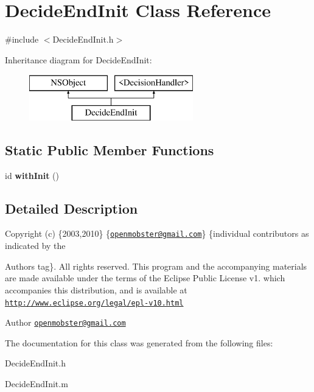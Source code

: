 \hypertarget{interface_decide_end_init}{
\section{\-Decide\-End\-Init \-Class \-Reference}
\label{interface_decide_end_init}
}


{\ttfamily \#include $<$\-Decide\-End\-Init.\-h$>$}

\-Inheritance diagram for \-Decide\-End\-Init\-:\begin{figure}[H]
\begin{center}
\leavevmode
\includegraphics[height=2.000000cm]{interface_decide_end_init}
\end{center}
\end{figure}
\subsection*{\-Static \-Public \-Member \-Functions}
\begin{DoxyCompactItemize}
\item 
\hypertarget{interface_decide_end_init_a112e4fd0f92b3ae2532c926bd04b22a0}{
id {\bfseries with\-Init} ()}
\label{interface_decide_end_init_a112e4fd0f92b3ae2532c926bd04b22a0}

\end{DoxyCompactItemize}


\subsection{\-Detailed \-Description}
\-Copyright (c) \{2003,2010\} \{\href{mailto:openmobster@gmail.com}{\tt openmobster@gmail.\-com}\} \{individual contributors as indicated by the \begin{DoxyAuthor}{\-Authors}
tag\}. \-All rights reserved. \-This program and the accompanying materials are made available under the terms of the \-Eclipse \-Public \-License v1. which accompanies this distribution, and is available at \href{http://www.eclipse.org/legal/epl-v10.html}{\tt http\-://www.\-eclipse.\-org/legal/epl-\/v10.\-html}
\end{DoxyAuthor}
\begin{DoxyAuthor}{\-Author}
\href{mailto:openmobster@gmail.com}{\tt openmobster@gmail.\-com} 
\end{DoxyAuthor}


\-The documentation for this class was generated from the following files\-:\begin{DoxyCompactItemize}
\item 
\-Decide\-End\-Init.\-h\item 
\-Decide\-End\-Init.\-m\end{DoxyCompactItemize}
